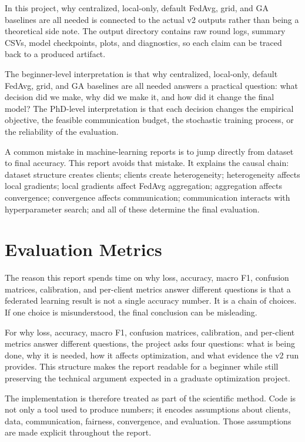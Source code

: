 \documentclass[11pt]{report}
\begin{document}
In this project, why centralized, local-only, default FedAvg, grid, and GA baselines are all needed
is connected to the actual v2 outputs rather than being a theoretical side note. The output
directory contains raw round logs, summary CSVs, model checkpoints, plots, and diagnostics, so each
claim can be traced back to a produced artifact.

The beginner-level interpretation is that why centralized, local-only, default FedAvg, grid, and GA
baselines are all needed answers a practical question: what decision did we make, why did we make
it, and how did it change the final model? The PhD-level interpretation is that each decision
changes the empirical objective, the feasible communication budget, the stochastic training process,
or the reliability of the evaluation.

A common mistake in machine-learning reports is to jump directly from dataset to final accuracy.
This report avoids that mistake. It explains the causal chain: dataset structure creates clients;
clients create heterogeneity; heterogeneity affects local gradients; local gradients affect FedAvg
aggregation; aggregation affects convergence; convergence affects communication; communication
interacts with hyperparameter search; and all of these determine the final evaluation.

\chapter{Evaluation Metrics}
The reason this report spends time on why loss, accuracy, macro F1, confusion matrices, calibration,
and per-client metrics answer different questions is that a federated learning result is not a
single accuracy number. It is a chain of choices. If one choice is misunderstood, the final
conclusion can be misleading.

For why loss, accuracy, macro F1, confusion matrices, calibration, and per-client metrics answer
different questions, the project asks four questions: what is being done, why it is needed, how it
affects optimization, and what evidence the v2 run provides. This structure makes the report
readable for a beginner while still preserving the technical argument expected in a graduate
optimization project.

The implementation is therefore treated as part of the scientific method. Code is not only a tool
used to produce numbers; it encodes assumptions about clients, data, communication, fairness,
convergence, and evaluation. Those assumptions are made explicit throughout the report.
\end{document}
